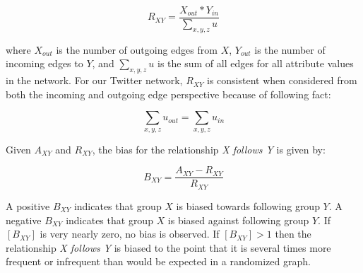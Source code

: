\[R_{XY} = \frac{X_{out}*Y_{in}}{\sum_{x,y,z}u}\]

where $X_{out}$ is the number of outgoing edges from $X$, $Y_{out}$ is the number of incoming edges to $Y$, and $\sum_{x,y,z}u$ is the sum of all edges for all attribute values in the network.  For our Twitter network, $R_{XY}$ is consistent when considered from both the incoming and outgoing edge perspective because of following fact:

\[\sum_{x,y,z}u_{out} = \sum_{x,y,z}u_{in}\]

Given $A_{XY}$ and $R_{XY}$, the bias for the relationship \textit{X follows Y} is given by:

\[B_{XY}=\frac{A_{XY}-R_{XY}}{R_{XY}}\]

A positive $B_{XY}$ indicates that group $X$ is biased towards following group $Y$.  A negative $B_{XY}$ indicates that group $X$ is biased against following group $Y$.  If $[B_{XY}]$ is very nearly zero, no bias is observed.  If $[B_{XY}] > 1$ then the relationship \textit{X follows Y} is biased to the point that it is several times more frequent or infrequent than would be expected in a randomized graph.
